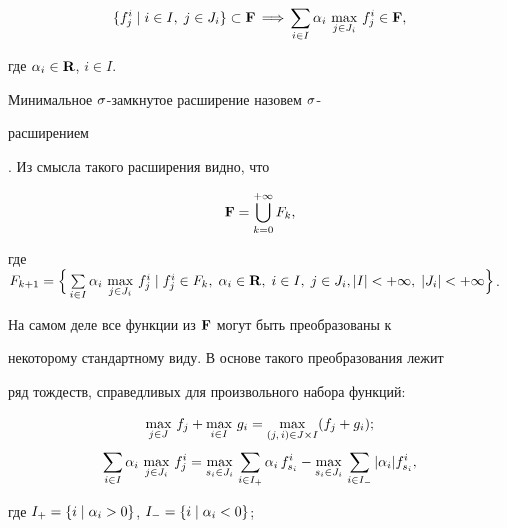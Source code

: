 \begin{equation}


\{f_j^i \mid i\in I,\; j\in J_i \} \su \F \,\Lra\,


\sij{i\in I}{} \al_i\, \max_{j\in J_i}\, f_j^i \in \F,


\end{equation}


где $\alpha_i \in \bold R$, $i\in I$.





Минимальное $\sigma$-замкнутое расширение назовем $\sigma$-{\it


расширением}. Из смысла такого расширения видно, что


$$


\F = \bigcup_{k=0}^{+\infty} F_k,


$$


где $F_{k+1}=\Bigl\{\, \svij{i\in I}{} \al_i\, \max\limits_{j\in


J_i}\, f_j^i \mid f_j^i \in F_k,\; \al_i \in \R, \;


i \in I,\; j\in J_i, |I|<\pli,\; |J_i|< \pli \Bigr\}$.





На самом деле все функции из $\bold F$ могут быть преобразованы к


некоторому стандартному виду. В основе такого преобразования лежит


ряд тождеств, справедливых для произвольного набора функций:


\begin{gather}


\max_{j\in J}\, f_j + \max_{i\in I}\, g_i = \max_{(j,\,i) \in


J\times I} (f_j +g_i);\\


%


\sij{i\in I}{} \al_i\, \max_{j\in J_i}\, f_j^i =


\max_{s_i\in J_i}\, \sij{i\in I_+}{} \al_i\, f_{s_i}^i -


\max_{s_i\in J_i}\, \sij{i\in I_-}{} |\al_i|f_{s_i}^i,


\end{gather}


где $I_+ =\{ i\mid \alpha_i >0\}$, $I_- =\{ i\mid \alpha_i <0\}$;


